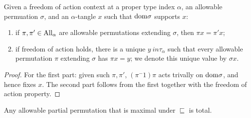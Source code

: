 \begin{proposition}
  \label{prop:allowable-partial-perm-action}
  Given a freedom of action context at a proper type index $\alpha$, an allowable permuation $\sigma$, and an $\alpha$-tangle $x$ such that $\mathrm{dom} \sigma$ supports $x$:
  \begin{enumerate}
    \item if $\pi, \pi' \in \mathrm{All}_\alpha$ are allowable permutations extending $\sigma$, then $\pi x = \pi' x$;
    \item if freedom of action holds, there is a unique $y \ in \tau_\alpha$ such that every allowable permutation $\pi$ extending $\sigma$ has $\pi x = y$; we denote this unique value by $\sigma x$.
  \end{enumerate}
\end{proposition}

\begin{proof}
  For the first part: given such $\pi, \pi'$, $(\pi^-1)\pi$ acts trivally on $\mathrm{dom} \sigma$, and hence fixes $x$.  The second part follows from the first together with the freedom of action property.
\end{proof}

\begin{lemma}
  \label{lem:maximal-allowable-partial-perm-total}
  Any allowable partial permutation that is maximal under $\sqsubseteq$ is total.
\end{lemma}

